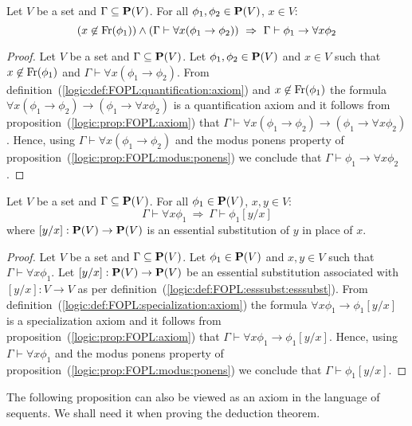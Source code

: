 \begin{prop}\label{logic:prop:FOPL:quantification}
Let $V$ be a set and $\Gamma\subseteq\mbox{${\bf P}(V)$}$. For all
$\phi_{1},\phi_{2}\in\mbox{${\bf P}(V)$}$, $x\in V$:
    \[
    (x\not\in\mbox{\rm Fr}(\phi_{1}))\land (\Gamma\vdash\forall x(\phi_{1}\to\phi_{2}))\ \Rightarrow\
    \Gamma\vdash\phi_{1}\to\forall x\phi_{2}
    \]
\end{prop}
\begin{proof}
Let $V$ be a set and $\Gamma\subseteq\mbox{${\bf P}(V)$}$. Let
$\phi_{1},\phi_{2}\in\mbox{${\bf P}(V)$}$ and $x\in V$ such that
$x\not\in\mbox{\rm Fr}(\phi_{1})$ and $\Gamma\vdash\forall
x(\phi_{1}\to\phi_{2})$. From
definition~(\ref{logic:def:FOPL:quantification:axiom}) and
$x\not\in\mbox{\rm Fr}(\phi_{1})$ the formula $\forall
x(\phi_{1}\to\phi_{2})\to(\phi_{1}\to\forall x\phi_{2})$ is a
quantification axiom and it follows from
proposition~(\ref{logic:prop:FOPL:axiom}) that $\Gamma\vdash\forall
x(\phi_{1}\to\phi_{2})\to(\phi_{1}\to\forall x\phi_{2})$. Hence,
using $\Gamma\vdash\forall x(\phi_{1}\to\phi_{2})$ and the modus
ponens property of proposition~(\ref{logic:prop:FOPL:modus:ponens})
we conclude that $\Gamma\vdash\phi_{1}\to\forall x\phi_{2}$.
\end{proof}

\begin{prop}\label{logic:prop:FOPL:specialization}
Let $V$ be a set and $\Gamma\subseteq\mbox{${\bf P}(V)$}$. For all $\phi_{1}\in\mbox{${\bf P}(V)$}$,
$x,y\in V$:
    \[
    \Gamma\vdash\forall x\phi_{1}\ \Rightarrow\
    \Gamma\vdash\phi_{1}[y/x]
    \]
where $[y/x]:\mbox{${\bf P}(V)$}\to\mbox{${\bf P}(V)$}$ is an essential substitution of $y$ in place
of $x$.
\end{prop}
\begin{proof}
Let $V$ be a set and $\Gamma\subseteq\mbox{${\bf P}(V)$}$. Let $\phi_{1}\in\mbox{${\bf P}(V)$}$ and
$x,y\in V$ such that $\Gamma\vdash\forall x\phi_{1}$. Let
$[y/x]:\mbox{${\bf P}(V)$}\to\mbox{${\bf P}(V)$}$ be an essential substitution associated with
$[y/x]:V\to V$ as per
definition~(\ref{logic:def:FOPL:esssubst:esssubst}). From
definition~(\ref{logic:def:FOPL:specialization:axiom}) the formula
$\forall x\phi_{1}\to\phi_{1}[y/x]$ is a specialization axiom and it
follows from proposition~(\ref{logic:prop:FOPL:axiom}) that
$\Gamma\vdash\forall x\phi_{1}\to\phi_{1}[y/x]$. Hence, using
$\Gamma\vdash\forall x \phi_{1}$ and the modus ponens property of
proposition~(\ref{logic:prop:FOPL:modus:ponens}) we conclude that
$\Gamma\vdash\phi_{1}[y/x]$.
\end{proof}

The following proposition can also be viewed as an axiom in the
language of sequents. We shall need it when proving the deduction
theorem.

